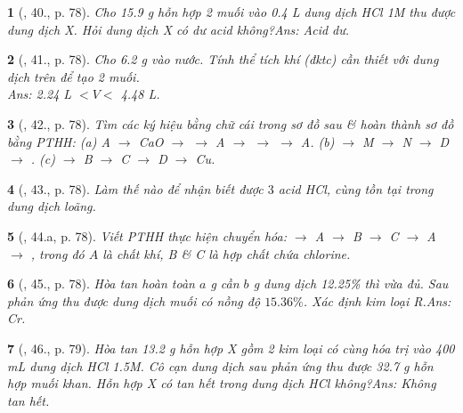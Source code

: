 \documentclass{article}
\newtheorem{baitoan}{}
\begin{document}
\begin{baitoan}[\cite{An_Hoa_Hoc_nang_cao_8_9}, 40., p. 78]
	Cho {\rm15.9 g} hỗn hợp 2 muối {\rm{}} vào {\rm0.4 L} dung dịch {\rm HCl 1M} thu được dung dịch X. Hỏi dung dịch X có dư acid không?\hfill{\sf Ans: Acid dư.}
\end{baitoan}

\begin{baitoan}[\cite{An_Hoa_Hoc_nang_cao_8_9}, 41., p. 78]
	Cho {\rm6.2 g } vào nước. Tính thể tích khí {\rm{}} (đktc) cần thiết với dung dịch trên để tạo 2 muối.\\\mbox{}\hfill{\sf Ans: 2.24 L $< V <$ 4.48 L.}
\end{baitoan}

\begin{baitoan}[\cite{An_Hoa_Hoc_nang_cao_8_9}, 42., p. 78]
	Tìm các ký hiệu bằng chữ cái trong sơ đồ sau \& hoàn thành sơ đồ bằng {\rm PTHH}: (a) {\rm A $\to$ CaO $\to$  $\to$ A $\to$  $\to$  $\to$ A}. (b) {\rm{} $\to$ M $\to$ N $\to$ D $\to$ }. (c) {\rm{} $\to$ B $\to$ C $\to$ D $\to$ Cu}.
\end{baitoan}

\begin{baitoan}[\cite{An_Hoa_Hoc_nang_cao_8_9}, 43., p. 78]
	Làm thế nào để nhận biết được $3$ acid {\rm HCl, } cùng tồn tại trong dung dịch loãng.	
\end{baitoan}

\begin{baitoan}[\cite{An_Hoa_Hoc_nang_cao_8_9}, 44.a, p. 78]
	Viết {\rm PTHH} thực hiện chuyển hóa: {\rm{} $\to$ A $\to$ B $\to$ C $\to$ A $\to$ }, trong đó $A$ là chất khí, B \& C là hợp chất chứa chlorine.
\end{baitoan}

\begin{baitoan}[\cite{An_Hoa_Hoc_nang_cao_8_9}, 45., p. 78]
	Hòa tan hoàn toàn $a$ {\rm g } cần $b$ {\rm g} dung dịch {\rm{} 12.25\%} thì vừa đủ. Sau phản ứng thu được dung dịch muối có nồng độ $15.36\%$. Xác định kim loại R.\hfill{\sf Ans: Cr.}
\end{baitoan}

\begin{baitoan}[\cite{An_Hoa_Hoc_nang_cao_8_9}, 46., p. 79]
	Hòa tan {\rm13.2 g} hỗn hợp X gồm 2 kim loại có cùng hóa trị vào {\rm400 mL} dung dịch {\rm HCl 1.5M}. Cô cạn dung dịch sau phản ứng thu được {\rm32.7 g} hỗn hợp muối khan. Hỗn hợp X có tan hết trong dung dịch {\rm HCl} không?\hfill{\sf Ans: Không tan hết.}
\end{baitoan}
\end{document}
